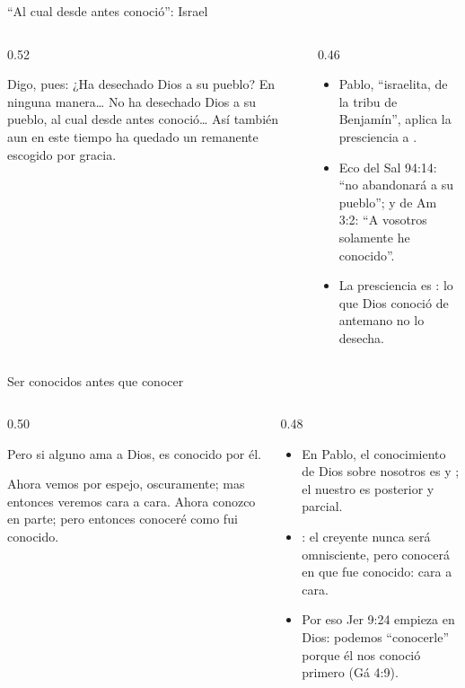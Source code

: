 \begin{frame}{``Al cual desde antes conoció'': Israel}
\begin{columns}[t,onlytextwidth]
\begin{column}{0.52\textwidth}
\begin{cita}Digo, pues: ¿Ha desechado Dios a su pueblo? En ninguna manera\ldots{} No ha desechado Dios a su pueblo, al cual desde antes conoció\ldots{} Así también aun en este tiempo ha quedado un remanente escogido por gracia.\end{cita}
\end{column}
\begin{column}{0.46\textwidth}\small
\begin{itemize}
\item Pablo, ``israelita, de la tribu de Benjamín'', aplica la presciencia a .
\item Eco del Sal 94:14: ``no abandonará \SENOR{} a su pueblo''; y de Am 3:2: ``A vosotros solamente he conocido''.
\item La presciencia es : lo que Dios conoció de antemano no lo desecha.
\end{itemize}
\end{column}
\end{columns}
\end{frame}

\begin{frame}{Ser conocidos antes que conocer}
\begin{columns}[t,onlytextwidth]
\begin{column}{0.50\textwidth}
\begin{cita}Pero si alguno ama a Dios, es conocido por él.\end{cita}
\begin{cita}Ahora vemos por espejo, oscuramente; mas entonces veremos cara a cara. Ahora conozco en parte; pero entonces conoceré como fui conocido.\end{cita}
\end{column}
\begin{column}{0.48\textwidth}\small
\begin{itemize}
\item En Pablo, el conocimiento de Dios sobre nosotros es  y ; el nuestro es posterior y parcial.
\item {}: el creyente nunca será omnisciente, pero conocerá  en que fue conocido: cara a cara.
\item Por eso Jer 9:24 empieza en Dios: podemos ``conocerle'' porque él nos conoció primero (Gá 4:9).
\end{itemize}
\end{column}
\end{columns}
\end{frame}

